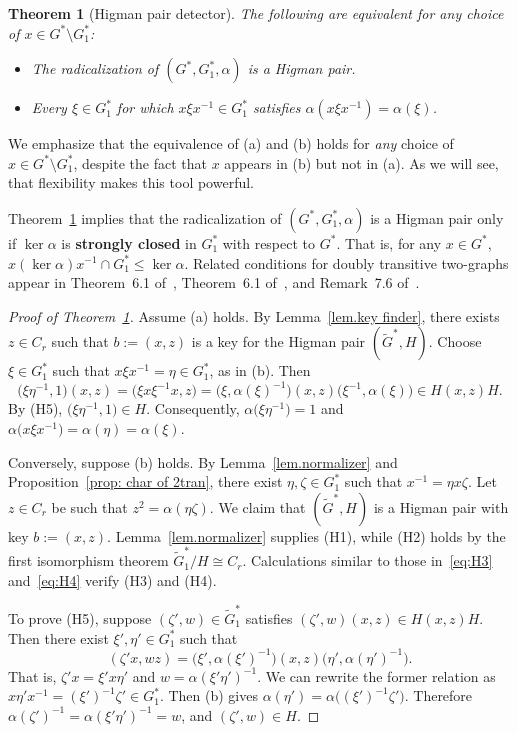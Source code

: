 \documentclass[11pt]{article}
\newtheorem{theorem}[theo]{Theorem}
\theoremstyle{definition}
\numberwithin{equation}{section}
\begin{document}
\begin{theorem}[Higman pair detector]
\label{thm.radicalization to Higman}
The following are equivalent for any choice of $x\in G^* \setminus G^*_1$:
\begin{itemize}
\item[(a)]
The radicalization of $(G^*,G^*_1,\alpha)$ is a Higman pair.
\item[(b)]
Every $\xi \in G^*_1$ for which $x\xi x^{-1} \in G^*_1$ satisfies $\alpha(x\xi x^{-1}) = \alpha(\xi)$.
\end{itemize}
\end{theorem}

We emphasize that the equivalence of (a) and (b) holds for \emph{any} choice of $x \in G^* \setminus G_1^*$, despite the fact that $x$ appears in (b) but not in (a).
As we will see, that flexibility makes this tool powerful.

Theorem~\ref{thm.radicalization to Higman} implies that the radicalization of $(G^*,G^*_1,\alpha)$ is a Higman pair only if $\ker \alpha $ is \textbf{strongly closed} in $G_1^*$ with respect to $G^*$.
That is, for any $x \in G^*$, $x(\ker \alpha)x^{-1} \cap G_1^* \leq \ker \alpha$.
Related conditions for doubly transitive two-graphs appear in Theorem~6.1 of~\cite{Taylor:77}, Theorem~6.1 of~\cite{Cameron:77}, and Remark~7.6 of~\cite{Seidel:76}.


\begin{proof}[Proof of Theorem~\ref{thm.radicalization to Higman}]
Assume (a) holds.
By Lemma~\ref{lem.key finder}, there exists $z \in C_r$ such that $b:=(x,z)$ is a key for the Higman pair $(\widetilde{G}^*,H)$.
Choose $\xi \in G_1^*$ such that $x \xi x^{-1} = \eta \in G^*_1$, as in (b).
Then
\[
\bigl(\xi \eta^{-1}, 1\bigr)(x,z)
= \bigl(\xi x \xi^{-1} x, z\bigr)
= \bigl(\xi, \alpha(\xi)^{-1} \bigr) (x,z) \bigl( \xi^{-1}, \alpha(\xi) \bigr)
\in H(x,z)H.
\]
By (H5), $\bigl(\xi \eta^{-1}, 1\bigr) \in H$. Consequently, $\alpha\bigl(\xi \eta^{-1}\bigr) = 1$ and $\alpha\bigl(x\xi x^{-1}\bigr) = \alpha(\eta) = \alpha(\xi)$.

Conversely, suppose (b) holds.
By Lemma~\ref{lem.normalizer} and Proposition~\ref{prop: char of 2tran}, there exist $\eta, \zeta \in G_1^*$ such that $x^{-1} = \eta x \zeta$.
Let $z \in C_r$ be such that $z^2 = \alpha(\eta \zeta)$.
We claim that $(\widetilde{G}^*,H)$ is a Higman pair with key $b := (x,z)$.
Lemma~\ref{lem.normalizer} supplies (H1), while (H2) holds by the first isomorphism theorem $\widetilde{G}^*_1 / H \cong C_r$.
Calculations similar to those in~\eqref{eq:H3} and~\eqref{eq:H4} verify (H3) and (H4).

To prove (H5), suppose $(\zeta',w) \in \widetilde{G}^*_1$ satisfies $(\zeta',w)(x,z) \in H(x,z)H$.
Then there exist $\xi',\eta' \in G_1^*$ such that
\[ (\zeta' x, wz) = \bigl(\xi', \alpha(\xi')^{-1}\bigr) (x,z) \bigl( \eta', \alpha(\eta')^{-1} \bigr). \]
That is, $\zeta' x = \xi' x \eta'$ and $w = \alpha( \xi' \eta')^{-1}$.
We can rewrite the former relation as $x \eta' x^{-1} = (\xi')^{-1} \zeta' \in G_1^*$.
Then (b) gives $\alpha(\eta') = \alpha\bigl( (\xi')^{-1} \zeta')$.
Therefore $\alpha(\zeta')^{-1} = \alpha(\xi' \eta')^{-1} = w$, and $(\zeta', w) \in H$.
\end{proof}
\end{document}
